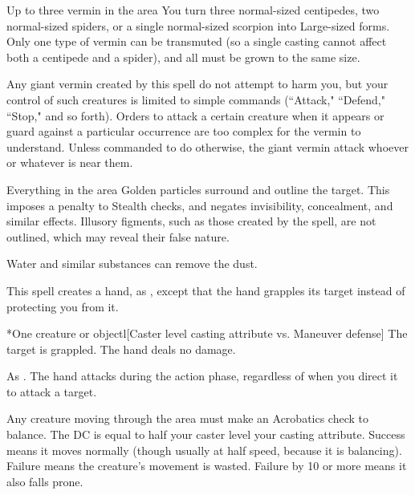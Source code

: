 \spelldur{\durmed}
\begin{spelltarget}{Up to three vermin in the area}
    \spelleffect You turn three normal-sized centipedes, two normal-sized spiders, or a single normal-sized scorpion into Large-sized forms. Only one type of vermin can be transmuted (so a single casting cannot affect both a centipede and a spider), and all must be grown to the same size.
    \par Any giant vermin created by this spell do not attempt to harm you, but your control of such creatures is limited to simple commands (``Attack," ``Defend," ``Stop," and so forth). Orders to attack a certain creature when it appears or guard against a particular occurrence are too complex for the vermin to understand. Unless commanded to do otherwise, the giant vermin attack whoever or whatever is near them.
\end{spelltarget}

\spelldur{\durshort}
\begin{spelltarget}{Everything in the area}
    \spelleffect Golden particles surround and outline the target. This imposes a  penalty to Stealth checks, and negates invisibility, concealment, and similar effects. Illusory figments, such as those created by the  spell, are not outlined, which may reveal their false nature.
\end{spelltarget}
\spellnotes Water and similar substances can remove the dust.

\spellrng{\rngmed}
\spelldur{\durshort \dismissable}
\spellline
\spelleffect This spell creates a hand, as , except that the hand grapples its target instead of protecting you from it.
\begin{spelltarget}*{One creature or object}l[Caster level \add casting attribute vs. Maneuver defense]
    \spellsuccess The target is grappled. The hand deals no damage.
\end{spelltarget}
\spellnotes As . The hand attacks during the action phase, regardless of when you direct it to attack a target.

\spelldur{\durshort \dismissable}
\spellline
\spelleffect Any creature moving through the area must make an Acrobatics check to balance. The DC is equal to half your caster level \add your casting attribute. Success means it moves normally (though usually at half speed, because it is balancing). Failure means the creature's movement is wasted. Failure by 10 or more means it also falls prone.


